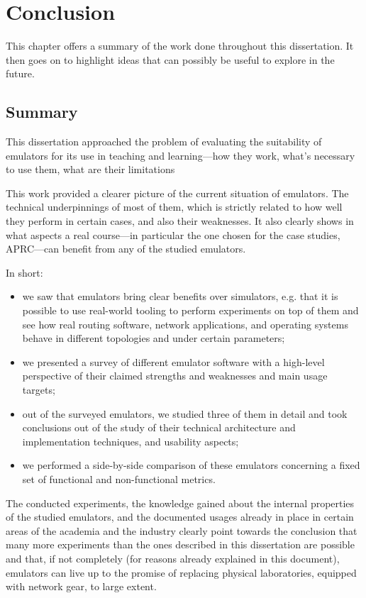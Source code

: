 
\chapter{Conclusion}
\label{ch:conclusion}

This chapter offers a summary of the work done throughout this dissertation.
It then goes on to highlight ideas that can possibly be useful to explore in the future.

\section{Summary}

This dissertation approached the problem of evaluating the suitability of emulators for its use in teaching and learning---how they work, what's necessary to use them, what are their limitations\textellipsis

This work provided a clearer picture of the current situation of emulators.
The technical underpinnings of most of them, which is strictly related to how well they perform in certain cases, and also their weaknesses.
It also clearly shows in what aspects a real course---in particular the one chosen for the case studies, APRC---can benefit from any of the studied emulators.

In short:
\begin{itemize}
  \item we saw that emulators bring clear benefits over simulators, e.g. that it is possible to use real-world tooling to perform experiments on top of them and see how real routing software, network applications, and operating systems behave in different topologies and under certain parameters;
  \item we presented a survey of different emulator software with a high-level perspective of their claimed strengths and weaknesses and main usage targets;
  \item out of the surveyed emulators, we studied three of them in detail and took conclusions out of the study of their technical architecture and implementation techniques, and usability aspects;
  \item we performed a side-by-side comparison of these emulators concerning a fixed set of functional and non-functional metrics.
\end{itemize}

The conducted experiments, the knowledge gained about the internal properties of the studied emulators, and the documented usages already in place in certain areas of the academia and the industry clearly point towards the conclusion that many more experiments than the ones described in this dissertation are possible and that, if not completely (for reasons already explained in this document), emulators can live up to the promise of replacing physical laboratories, equipped with network gear, to large extent.

